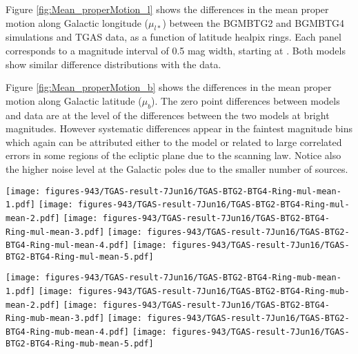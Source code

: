 Figure \ref{fig:Mean_properMotion_l} shows the differences in the mean proper motion along Galactic longitude ($\mu_{l *}$) between the BGMBTG2 and BGMBTG4 simulations and TGAS data, as a function of latitude healpix rings. Each panel corresponds to a magnitude interval of 0.5 mag width, starting at . Both models show similar difference distributions with the data. 

Figure \ref{fig:Mean_properMotion_b} shows the differences in the mean proper motion along Galactic latitude ($\mu_b$). The zero point differences between models and data are at the level of the differences between the two models at bright magnitudes. However systematic differences appear in the faintest magnitude bins 
which again can be attributed either to the model or
related to large correlated errors in some regions of the ecliptic plane due to the scanning law. Notice also the higher noise level at the Galactic poles due to the smaller number of sources. 

\begin{figure*}
\begin{center}
\texttt{[image: figures-943/TGAS-result-7Jun16/TGAS-BTG2-BTG4-Ring-mul-mean-1.pdf]}
\texttt{[image: figures-943/TGAS-result-7Jun16/TGAS-BTG2-BTG4-Ring-mul-mean-2.pdf]}
\texttt{[image: figures-943/TGAS-result-7Jun16/TGAS-BTG2-BTG4-Ring-mul-mean-3.pdf]}
\texttt{[image: figures-943/TGAS-result-7Jun16/TGAS-BTG2-BTG4-Ring-mul-mean-4.pdf]}
\texttt{[image: figures-943/TGAS-result-7Jun16/TGAS-BTG2-BTG4-Ring-mul-mean-5.pdf]}
\caption{Difference in mean proper motion along Galactic longitude ($\mu_{l *}$) between TGAS data and two models: BGMBTG2 (red), BGMBTG4 (blue), in different magnitude intervals, between $V_T$=9 (left) to $V_T$=11.5 (right) by steps of 0.5 magnitude.  }
\label{fig:Mean_properMotion_l}
\end{center}
\end{figure*}

\begin{figure*}
\begin{center}
\texttt{[image: figures-943/TGAS-result-7Jun16/TGAS-BTG2-BTG4-Ring-mub-mean-1.pdf]}
\texttt{[image: figures-943/TGAS-result-7Jun16/TGAS-BTG2-BTG4-Ring-mub-mean-2.pdf]}
\texttt{[image: figures-943/TGAS-result-7Jun16/TGAS-BTG2-BTG4-Ring-mub-mean-3.pdf]}
\texttt{[image: figures-943/TGAS-result-7Jun16/TGAS-BTG2-BTG4-Ring-mub-mean-4.pdf]}
\texttt{[image: figures-943/TGAS-result-7Jun16/TGAS-BTG2-BTG4-Ring-mub-mean-5.pdf]}
\caption{Difference in mean proper motion along Galactic latitude ($\mu_b$) between TGAS data and two models: BGMBTG2 (red), BGMBTG4 (blue), in different magnitude intervals, between $V_T$=9 (left) to $V_T$=11.5 (right) by steps of 0.5 magnitude.}
\label{fig:Mean_properMotion_b}
\end{center}
\end{figure*}


